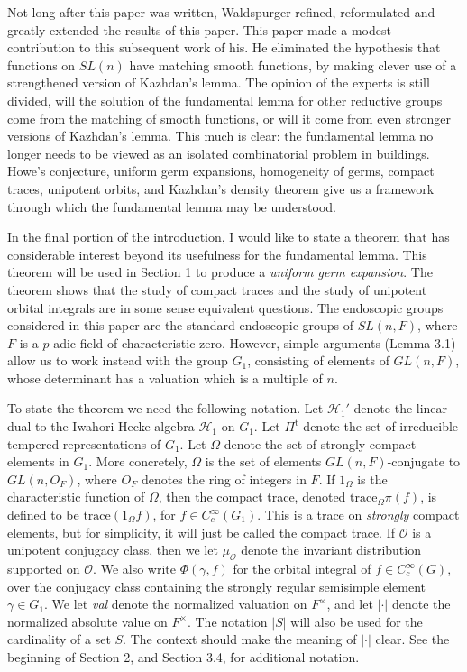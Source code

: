 \documentclass{amsart}
\begin{document}
Not long after this paper was written,
Waldspurger refined, reformulated and greatly extended the results of this paper. 
This paper made a modest contribution to this
subsequent work of his.
He eliminated the hypothesis that functions on $SL(n)$ have matching smooth
functions, by making clever use of a strengthened version of Kazhdan's lemma.
The opinion of the experts is still divided, will the solution of the fundamental
lemma for other reductive groups come from the matching of smooth functions, 
or will it come from even stronger
versions of Kazhdan's lemma.  This much is clear: the fundamental lemma
no longer needs to be viewed as an isolated combinatorial problem in buildings. 
Howe's conjecture, uniform germ expansions, homogeneity of germs, compact traces, unipotent orbits,
and Kazhdan's density theorem give us a framework through which the fundamental
lemma may be understood.  

In the final portion of the introduction, I would like to state a
theorem that has considerable interest beyond its usefulness for the
fundamental lemma.   This theorem will be used in Section 1 to produce
a {\it uniform germ expansion}.   The theorem shows that the study of compact traces
and the study of unipotent orbital integrals are in some sense
equivalent questions.
The endoscopic groups considered in this paper are the standard endoscopic groups
of $SL(n,F)$, where $F$ is a $p$-adic field of characteristic zero.  
However, simple arguments (Lemma 3.1) allow us to work instead with the group
$G_1$, consisting of elements of $GL(n,F)$, whose
determinant has a valuation which is a multiple of $n$.  

To state the theorem we need the following notation.
Let ${\mathcal H}_1'$ denote the linear dual to the Iwahori Hecke algebra 
${\mathcal H}_1$  on $G_1$.  Let $\Pi^{\text{t}}$ denote the set of irreducible
tempered representations of $G_1$. Let $\Omega$ denote the set
of strongly compact elements in $G_1$.  More concretely, $\Omega$
is the set of elements $GL(n,F)$-conjugate to $GL(n,O_F)$, where
$O_F$ denotes the ring of integers in $F$.  
If $1_\Omega$ is the characteristic function
of $\Omega$, then the compact trace, denoted 
$\text{trace}_\Omega\pi(f) $, is defined to be $\text{trace}
(1_\Omega f)$, for $f\in C_c^\infty(G_1)$.  
This is a trace on {\it strongly} compact elements, but for simplicity, it
will just be called the compact trace.
If ${\mathcal O}$ is a unipotent
conjugacy class, then we let $\mu_{\mathcal O}$ denote the invariant distribution
supported on ${\mathcal O}$.  We also write $\Phi(\gamma,f)$ for the
orbital integral of $f\in C_c^\infty(G)$, over the conjugacy class
containing the strongly regular
semisimple element $\gamma\in G_1$.  
We let {\sl val} denote the normalized valuation on $F^\times$, and let $|\cdot|$
denote the normalized absolute value on $F^\times$.  The notation $|S|$ will also be
used for the cardinality of a set $S$.  The context should make the meaning of
$|\cdot|$ clear.
See the beginning of Section 2, and
Section 3.4, for additional notation.
\end{document}
